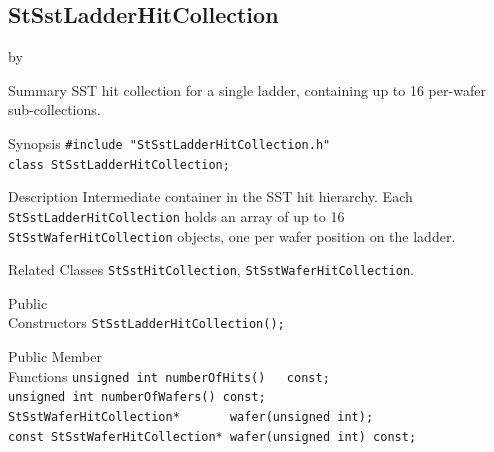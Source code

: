 \documentclass[twoside]{article}
\newcommand{\entrylabel}[1]{\mbox{\textbf{{#1}}}\hfil}%
\newenvironment{entry}
{\begin{list}{}%
    {\renewcommand{\makelabel}{\entrylabel}%
     \setlength{\labelwidth}{90pt}%
     \setlength{\leftmargin}{\labelwidth}
     \advance\leftmargin by \labelsep%
      }%
    }%
  {\end{list}}
\newcommand{\Entrylabel}[1]%
{\raisebox{0pt}[1ex][0pt]{\makebox[\labelwidth][l]%
    {\parbox[t]{\labelwidth}{\hspace{0pt}\textbf{{#1}}}}}}
\newenvironment{Entry}%
{\renewcommand{\entrylabel}{\Entrylabel}\begin{entry}}%
  {\end{entry}}
\begin{document}
\subsection{StSstLadderHitCollection}
\label{sec:StSstLadderHitCollection}
\begin{Entry}
\item[Summary] SST hit collection for a single ladder, containing up to 16
    per-wafer sub-collections.
\item[Synopsis]
    \verb+#include "StSstLadderHitCollection.h"+\\
    \verb+class StSstLadderHitCollection;+\\
\item[Description]
    Intermediate container in the SST hit hierarchy.  Each
    \texttt{StSstLadderHitCollection} holds an array of up to 16
    \texttt{StSstWaferHitCollection} objects, one per wafer position on the
    ladder.
\item[Related Classes]
    \texttt{StSstHitCollection}, \texttt{StSstWaferHitCollection}.
\item[Public\\ Constructors]
    \verb+StSstLadderHitCollection();+\\
\item[Public Member\\ Functions]
    \verb+unsigned int numberOfHits()   const;+\\
    \verb+unsigned int numberOfWafers() const;+\\
    \verb+StSstWaferHitCollection*       wafer(unsigned int);+\\
    \verb+const StSstWaferHitCollection* wafer(unsigned int) const;+\\
\end{Entry}
\clearpage
\end{document}
